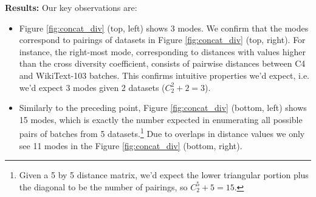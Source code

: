 \textbf{Results:}
Our key observations are:
\begin{itemize}
    \item Figure \ref{fig:concat_div} (top, left) shows 3 modes. 
    We confirm that the modes correspond to pairings of datasets in Figure \ref{fig:concat_div} (top, right). 
    For instance, the right-most mode, corresponding to distances with values higher than the cross diversity coefficient, consists of pairwise distances between C4 and WikiText-103 batches. 
    This confirms intuitive properties we'd expect, i.e. we'd expect 3 modes given 2 datasets ($C^2_2 + 2 = 3$).
    \item Similarly to the preceding point, Figure \ref{fig:concat_div} (bottom, left) shows 15 modes, which is exactly the number expected in enumerating all possible pairs of batches from 5 datasets.\footnote{Given a 5 by 5 distance matrix, we'd expect the lower triangular portion plus the diagonal to be the number of pairings, so $C^5_2 + 5 = 15$.}
    Due to overlaps in distance values we only see 11 modes in the Figure \ref{fig:concat_div} (bottom, right).

\end{itemize}
